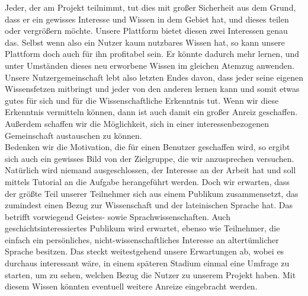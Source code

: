 \documentclass{article}
\begin{document}
Jeder, der am Projekt teilnimmt, tut dies mit großer Sicherheit aus dem Grund, dass er ein gewisses Interesse und Wissen in dem Gebiet hat, und dieses teilen oder vergrößern möchte. Unsere Plattform bietet diesen zwei Interessen genau das. Selbst wenn also ein Nutzer kaum nutzbares Wissen hat, so kann unsere Plattform doch auch für ihn profitabel sein. Er könnte dadurch mehr lernen, und unter Umständen dieses neu erworbene Wissen im gleichen Atemzug anwenden. Unsere Nutzergemeinschaft lebt also letzten Endes davon, dass jeder seine eigenen Wissensfetzen mitbringt und jeder von den anderen lernen kann und somit etwas gutes für sich und für die Wissenschaftliche Erkenntnis tut. Wenn wir diese Erkenntnis vermitteln können, dann ist auch damit ein großer Anreiz geschaffen. Außerdem schaffen wir die Möglichkeit, sich in einer interessenbezogenen Gemeinschaft austauschen zu können. \\
Bedenken wir die Motivation, die für einen Benutzer geschaffen wird, so ergibt sich auch ein gewisses Bild von der Zielgruppe, die wir anzusprechen versuchen. Natürlich wird niemand ausgeschlossen, der Interesse an der Arbeit hat und soll mittels Tutorial an die Aufgabe herangeführt werden. Doch wir erwarten, dass der größte Teil unserer Teilnehmer sich aus einem Publikum zusammensetzt, das zumindest einen Bezug zur Wissenschaft und der lateinischen Sprache hat. Das betrifft vorwiegend Geistes- sowie Sprachwissenschaften. Auch geschichtsinteressiertes Publikum wird erwartet, ebenso wie Teilnehmer, die einfach ein persönliches, nicht-wissenschaftliches Interesse an altertümlicher Sprache besitzen. Das steckt weitestgehend unsere Erwartungen ab, wobei es durchaus interessant wäre, in einem späteren Stadium einmal eine Umfrage zu starten, um zu sehen, welchen Bezug die Nutzer zu unserem Projekt haben. Mit diesem Wissen könnten eventuell weitere Anreize eingebracht werden.

\end{document}
